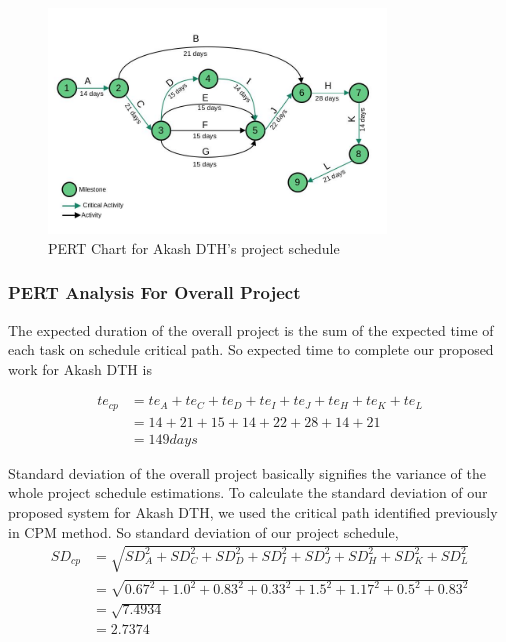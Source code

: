 \begin{spacing}{1}
\begin{figure}[H]
	\centering
	\includegraphics[width=0.8\textwidth]{PERT}
	\caption{PERT Chart for Akash DTH's project schedule}
	\label{fig:pert}
\end{figure} 
 
\subsubsection{PERT Analysis For Overall Project}
The expected duration of the overall project is the sum of the expected time of each task on schedule critical path. So expected time to complete our proposed work for Akash DTH is \newline

\begin{equation*}
	\begin{split}
		te_{cp} &= te_A + te_C + te_D + te_I + te_J + te_H + te_K + te_L \\
		&= 14 + 21 + 15 + 14 + 22 + 28 + 14 + 21 \\
		& = 149  days
	\end{split}
\end{equation*}

Standard deviation of the overall project basically signifies the variance of the whole project schedule estimations. To calculate the standard deviation of our proposed system for Akash DTH, we used the critical path identified previously in CPM method. 
So standard deviation of our project schedule,
\begin{equation*} 
	\begin{split}
		SD_{cp} &= \sqrt{SD_A^2 + SD_C^2 + SD_D^2 + SD_I^2 + SD_J^2  + SD_H^2 + SD_K^2 + SD_L^2 } \\
		&= \sqrt{0.67^2 + 1.0^2 + 0.83^2 + 0.33^2 + 1.5^2 + 1.17^2 + 0.5^2 + 0.83^2 } \\
		& = \sqrt{7.4934} \\
		& = 2.7374
	\end{split}
\end{equation*} 


\end{spacing}
